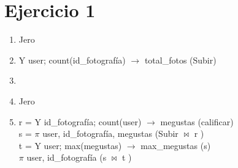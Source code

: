 \documentclass[a4paper, 12pt]{report}
\begin{document}
\section*{Ejercicio 1}{
\begin{enumerate}[label=\alph*)]
\item{Jero}
\item{ Y user; count(id\_fotografía) $\rightarrow$ total\_fotos (Subir)\\
}
\item{}
\item{Jero}
\item{r = Y id\_fotografía; count(user) $\rightarrow$ megustas (calificar)\\
s = $\pi$ user, id\_fotografía, megustas (Subir $\Join$ r )\\
t = Y user; max(megustas) $\rightarrow$ max\_megustas (s)\\
$\pi$ user, id\_fotografía (s $\Join$ t )}
\end{enumerate}
}
\end{document}
